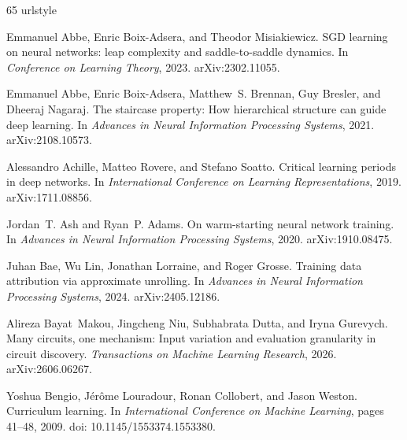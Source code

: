 \begin{thebibliography}{65}
\providecommand{\natexlab}[1]{#1}
\providecommand{\url}[1]{\texttt{#1}}
\expandafter\ifx\csname urlstyle\endcsname\relax
  \providecommand{\doi}[1]{doi: #1}\else
  \providecommand{\doi}{doi: \begingroup \urlstyle{rm}\Url}\fi

Emmanuel Abbe, Enric Boix-Adsera, and Theodor Misiakiewicz.
\newblock SGD learning on neural networks: leap complexity and saddle-to-saddle dynamics.
\newblock In \emph{Conference on Learning Theory}, 2023.
\newblock arXiv:2302.11055.

Emmanuel Abbe, Enric Boix-Adsera, Matthew~S. Brennan, Guy Bresler, and Dheeraj Nagaraj.
\newblock The staircase property: How hierarchical structure can guide deep learning.
\newblock In \emph{Advances in Neural Information Processing Systems}, 2021.
\newblock arXiv:2108.10573.

Alessandro Achille, Matteo Rovere, and Stefano Soatto.
\newblock Critical learning periods in deep networks.
\newblock In \emph{International Conference on Learning Representations}, 2019.
\newblock arXiv:1711.08856.

Jordan~T. Ash and Ryan~P. Adams.
\newblock On warm-starting neural network training.
\newblock In \emph{Advances in Neural Information Processing Systems}, 2020.
\newblock arXiv:1910.08475.

Juhan Bae, Wu Lin, Jonathan Lorraine, and Roger Grosse.
\newblock Training data attribution via approximate unrolling.
\newblock In \emph{Advances in Neural Information Processing Systems}, 2024.
\newblock arXiv:2405.12186.

Alireza Bayat~Makou, Jingcheng Niu, Subhabrata Dutta, and Iryna Gurevych.
\newblock Many circuits, one mechanism: Input variation and evaluation granularity in circuit discovery.
\newblock \emph{Transactions on Machine Learning Research}, 2026.
\newblock arXiv:2606.06267.

Yoshua Bengio, J{\'e}r{\^o}me Louradour, Ronan Collobert, and Jason Weston.
\newblock Curriculum learning.
\newblock In \emph{International Conference on Machine Learning}, pages 41--48, 2009.
\newblock doi: 10.1145/1553374.1553380.


\end{thebibliography}
